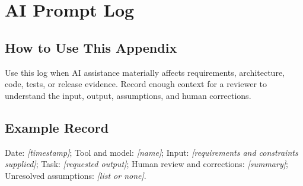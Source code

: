 \chapter{AI Prompt Log}
\section{How to Use This Appendix}
Use this log when AI assistance materially affects requirements, architecture, code, tests, or release evidence. Record enough context for a reviewer to understand the input, output, assumptions, and human corrections.
\section{Example Record}
Date: \textit{[timestamp]}; Tool and model: \textit{[name]}; Input: \textit{[requirements and constraints supplied]}; Task: \textit{[requested output]}; Human review and corrections: \textit{[summary]}; Unresolved assumptions: \textit{[list or none]}.
